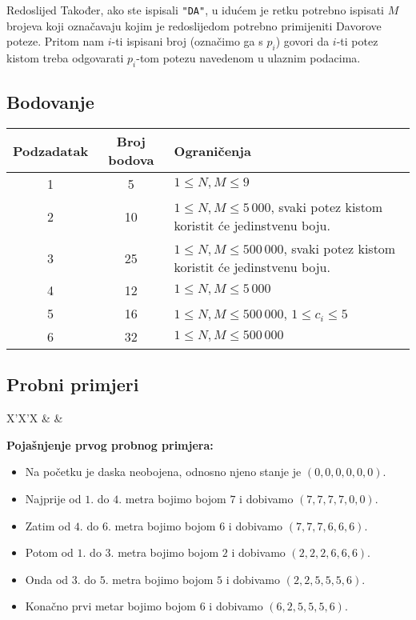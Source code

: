 \begin{statement}[
  problempoints=100,
  timelimit=4 sekunde,
  memorylimit=512 MiB,
]{Redoslijed}
Također, ako ste ispisali \texttt{"DA"}, u idućem je retku potrebno ispisati
$M$ brojeva koji označavaju kojim je redoslijedom potrebno primijeniti Davorove
poteze. Pritom nam $i$-ti ispisani broj (označimo ga s $p_i$) govori da $i$-ti
potez kistom treba odgovarati $p_i$-tom potezu navedenom u ulaznim podacima.

\subsection*{Bodovanje}
{\renewcommand{\arraystretch}{1.4}
  \setlength{\tabcolsep}{6pt}
  \begin{tabular}{ccl}
 Podzadatak & Broj bodova & Ograničenja \\ \midrule
  1 & 5 & $1 \le N, M \le 9$ \\
  2 & 10 & $1 \le N, M \le 5\,000$, svaki potez kistom koristit će jedinstvenu boju. \\
  3 & 25 & $1 \le N, M \le 500\,000$, svaki potez kistom koristit će jedinstvenu boju. \\
  4 & 12 & $1 \le N, M \le 5\,000$ \\
  5 & 16 & $1 \le N, M \le 500\,000$, $1 \le c_i \le 5$\\
  6 & 32 & $1 \le N, M \le 500\,000$ \\
\end{tabular}}

\subsection*{Probni primjeri}
\begin{tabularx}{\textwidth}{X'X'X}
 &
 &
\end{tabularx}

\textbf{Pojašnjenje prvog probnog primjera:}
\begin{itemize}
  \item Na početku je daska neobojena, odnosno njeno stanje je $(0, 0, 0, 0, 0, 0)$.
  \item Najprije od $1.$ do $4.$ metra bojimo bojom $7$ i dobivamo $(7, 7, 7, 7, 0, 0)$.
  \item Zatim od $4.$ do $6.$ metra bojimo bojom $6$ i dobivamo $(7, 7, 7, 6, 6, 6)$.
  \item Potom od $1.$ do $3.$ metra bojimo bojom $2$ i dobivamo $(2, 2, 2, 6, 6, 6)$.
  \item Onda od $3.$ do $5.$ metra bojimo bojom $5$ i dobivamo $(2, 2, 5, 5, 5, 6)$.
  \item Konačno prvi metar bojimo bojom $6$ i dobivamo $(6, 2, 5, 5, 5, 6)$.
\end{itemize}


\end{statement}
